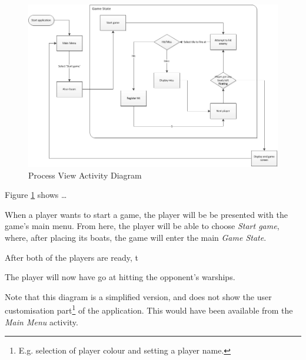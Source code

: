     
\begin{figure}[ht]
    \includegraphics[angle=90, scale=0.8]{ProcessLayer.png}
    \caption{Process View Activity Diagram}
    \label{fig:ActivityDiagram}
\end{figure}

Figure \ref{fig:ActivityDiagram} shows …

When a player wants to start a game, the player will be be presented with the game's main menu. From here, the player will be able to choose \emph{Start game}, where, after placing its boats, the game will enter the main \emph{Game State}.

After both of the players are ready, t

The player will now have go at hitting the opponent's warships.


Note that this diagram is a simplified version, and does not show the user customisation part\footnote{E.g. selection of player colour and setting a player name.} of the application. This would have been available from the \emph{Main Menu} activity.